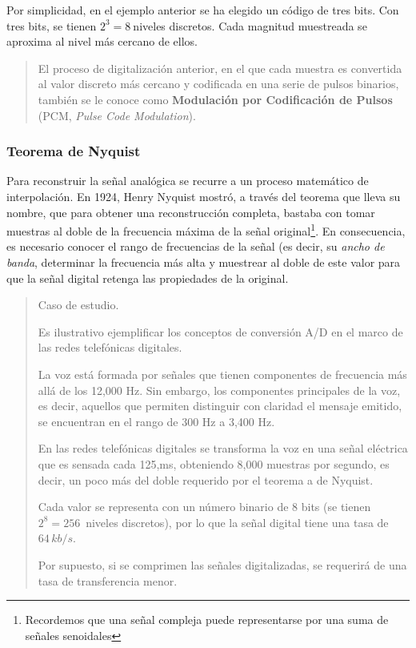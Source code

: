 \documentclass[
]{book}
\begin{document}
Por simplicidad, en el ejemplo anterior se ha elegido un código de tres bits. Con tres bits, se tienen \(2^3=8~\)niveles discretos. Cada magnitud muestreada se aproxima al nivel más cercano de ellos.

\begin{quote}
El proceso de digitalización anterior, en el que cada muestra es convertida al valor discreto más cercano y codificada en una serie de pulsos binarios, también se le conoce como \textbf{Modulación por Codificación de Pulsos} (PCM, \emph{Pulse Code Modulation}).
\end{quote}

\hypertarget{teorema-de-nyquist}{%
\subsubsection*{Teorema de Nyquist}\label{teorema-de-nyquist}}

Para reconstruir la señal analógica se recurre a un proceso matemático de interpolación. En 1924, Henry Nyquist mostró, a través del teorema que lleva su nombre, que para obtener una reconstrucción completa, bastaba con tomar muestras al doble de la frecuencia máxima de la señal original\footnote{Recordemos que una señal compleja puede representarse por una suma de señales senoidales}. En consecuencia, es necesario conocer el rango de frecuencias de la señal (es decir, su \emph{ancho de banda}, determinar la frecuencia más alta y muestrear al doble de este valor para que la señal digital retenga las propiedades de la original.

\begin{quote}
Caso de estudio.

Es ilustrativo ejemplificar los conceptos de conversión A/D en el marco de las redes telefónicas digitales.

La voz está formada por señales que tienen componentes de frecuencia más allá de los 12,000 Hz. Sin embargo, los componentes principales de la voz, es decir, aquellos que permiten distinguir con claridad el mensaje emitido, se encuentran en el rango de 300 Hz a 3,400 Hz.

En las redes telefónicas digitales se transforma la voz en una señal eléctrica que es sensada cada 125,ms, obteniendo 8,000 muestras por segundo, es decir, un poco más del doble requerido por el teorema a de Nyquist.

Cada valor se representa con un número binario de 8 bits (se tienen \(2^8=256\,\) niveles discretos), por lo que la señal digital tiene una tasa de \(64\,kb/s\).

Por supuesto, si se comprimen las señales digitalizadas, se requerirá de una tasa de transferencia menor.
\end{quote}
\end{document}
